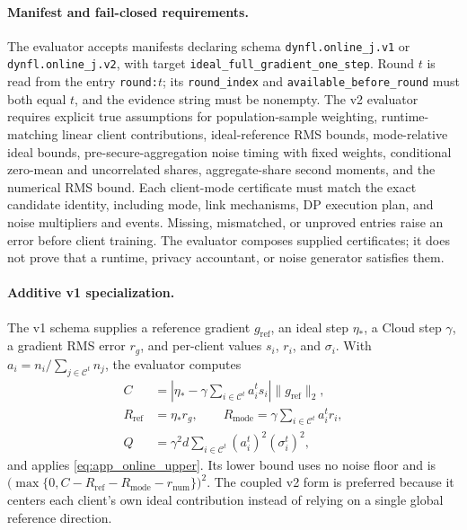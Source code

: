 \documentclass[5p,times]{elsarticle}
\theoremstyle{plain}
\theoremstyle{definition}
\theoremstyle{remark}
\begin{document}
\paragraph{Manifest and fail-closed requirements.}
The evaluator accepts manifests declaring schema
\texttt{dynfl.online\_j.v1} or \texttt{dynfl.online\_j.v2}, with target
\texttt{ideal\_full\_gradient\_one\_step}. Round $t$ is read from the
entry \texttt{round:$t$}; its \texttt{round\_index} and
\texttt{available\_before\_round} must both equal $t$, and the evidence
string must be nonempty. The v2 evaluator requires explicit true
assumptions for population-sample weighting, runtime-matching linear
client contributions, ideal-reference RMS bounds, mode-relative ideal
bounds, pre-secure-aggregation noise timing with fixed weights,
conditional zero-mean and uncorrelated shares, aggregate-share second
moments, and the numerical RMS bound. Each client-mode certificate must
match the exact candidate identity, including mode, link mechanisms, DP
execution plan, and noise multipliers and events. Missing, mismatched,
or unproved entries raise an error before client training. The
evaluator composes supplied certificates; it does not prove that a
runtime, privacy accountant, or noise generator satisfies them.

\paragraph{Additive v1 specialization.}
The v1 schema supplies a reference gradient $g_{\mathrm{ref}}$, an
ideal step $\eta_*$, a Cloud step $\gamma$, a gradient RMS error $r_g$,
and per-client values $s_i$, $r_i$, and $\sigma_i$. With
$a_i=n_i/\sum_{j\in\mathcal C^t}n_j$, the evaluator computes
\begin{equation}
\begin{aligned}
C&=\left|\eta_*-\gamma\sum_{i\in\mathcal C^t}a_i^ts_i\right|
\|g_{\mathrm{ref}}\|_2,\\
R_{\mathrm{ref}}&=\eta_*r_g,\qquad
R_{\mathrm{mode}}=\gamma\sum_{i\in\mathcal C^t}a_i^tr_i,\\
Q&=\gamma^2d\sum_{i\in\mathcal C^t}(a_i^t)^2(\sigma_i^t)^2,
\end{aligned}
\end{equation}
and applies \eqref{eq:app_online_upper}. Its lower bound uses no noise
floor and is
$\bigl(\max\{0,C-R_{\mathrm{ref}}-R_{\mathrm{mode}}-r_{\mathrm{num}}\}\bigr)^2$.
The coupled v2 form is preferred because it centers each client's own
ideal contribution instead of relying on a single global reference
direction.
\end{document}
